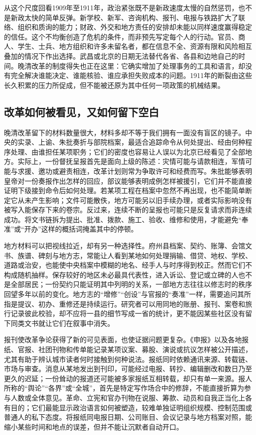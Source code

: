 从这个尺度回看1909年至1911年，政治紧张既不是新政速度太慢的自然惩罚，也不是新政太快的简单反弹。新学校、新军、咨询机构、报刊、电报与铁路扩大了联络、组织和质询的能力；财政、外交和地方责任的安排却未能以同样速度赢得稳定的信任。这个不均衡创造了危机的条件，而非预先写定每个人的行动。官员、商人、学生、士兵、地方组织和许多未留名者，都在信息不全、资源有限和风险相互叠加的情况下作出选择。武昌或北京的日期无法替代各省、各县和边地自己的时间。晚清改革的制度得失也正在这里：它确实增加了处理事务的工具和语言，却没有完全解决谁能决定、谁能核验、谁应承担失败成本的问题。1911年的断裂由这些长久积累的压力所促成，但不能被还原为其中任何一项政策的机械结果。

\subsection{改革如何被看见，又如何留下空白}

晚清改革留下的材料数量很大，材料多却不等于我们拥有一面没有盲区的镜子。中央的实录、上谕、朱批奏折与部院档案，最适合追踪命令从何处提出、经由何种程序处理、由谁担任某项职务；它们的密度也容易让人误以为北京已经看见了全部地方。实际上，一份督抚呈报首先是面向上级的陈述：灾情可能与请款相连，军情可能与求援、邀功或避责相连，改革计划则常为争取许可和经费而写。朱批能够表明皇帝对一份奏报作出怎样的回应，部议能够表明成例怎样被援引，它们并不能直接证明下级接到命令后如何处理。若某项工程在档案中忽然不再出现，也不能简单断定它从未产生影响；文件可能散佚，地方可能另以旧手续办理，或者实际影响没有被写入能保存下来的卷宗。反过来，连续不断的呈报也可能只是反复请求而非连续成功。将文书链拆为提出、批准、拨款、施工、验收、维修和使用，才能避免“奉准”或“开办”这样的概括词掩盖其中的停顿。

地方材料可以把视线拉近，却有另一种选择性。府州县档案、契约、账簿、会馆文书、族谱、碑刻与地方志，常能让人看到某地如何处理捐输、借贷、地权、学校、道路或治安，也能使中央档案中模糊的地名、经手人与时序得到校正。然而它们不构成随机抽样。保存较好的地区未必最具代表性，进入诉讼、登记或立碑的人也不是全部居民；一份契约只能证明其中列明的关系，一部地方志往往以修志时的秩序回望多年以前的变化。地方志的“增修”“创设”与官报的“奏准”一样，需要追问其所指是提议、初办、重修还是持续运行。研究者可以用同地的账册、报刊、案卷和旅行记录彼此校验，却不应将一县的细节写成一省的统计，更不能因某些社区没有留下同类文书就让它们在叙事中消失。

报刊使改革争论获得了新的可见表面，也使证据问题更复杂。《申报》以及各地报纸、官报、社团刊物和传单能记录某项议案、募股、演说或抗议怎样被公开描述，尤其有助于辨认城市读者何时接触到何种说法。报纸同时依赖通讯来源、转载链、市场与审查。消息从某地发出到刊印，可能经过电报、转抄、编辑删改和数日乃至更久的迟延；一份耸动的报道还可能被多家报纸互相转载，却只有单一来源。报人所称的“舆论”“各界”或“全城”，首先是特定写作场合中的修辞，不能直接折算为参与人数或全体意见。革命、立宪和官办刊物在说服、筹款、动员和自我正当化上各有目的；它们最能显示政治语言如何被塑造，较难单独证明组织规模、控制范围或普通人的私下态度。将报纸同电报日期、公司账目、会议记录与地方档案对照，能缩小某些时间和地点的误差，但并不能让沉默者自动开口。

